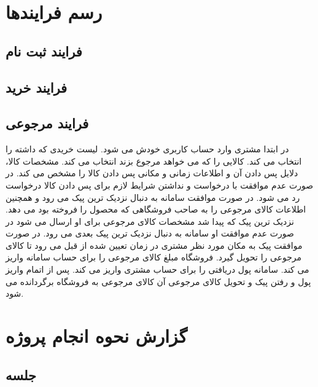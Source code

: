 \documentclass[12pt,a4paper]{article}
\begin{document}
\maketitle
\pagebreak
\tableofcontents
\pagebreak
\normalsize	



\pagebreak
\section{رسم فرایندها} \label{section.function}

\subsection{فرایند ثبت نام} \label{section.function.register}


\subsection{فرایند خرید} \label{section.function.buy}


\subsection{فرایند مرجوعی} \label{section.function.return}

در ابتدا مشتری وارد حساب کاربری خودش می شود. لیست خریدی که داشته را انتخاب می کند. کالایی را که می خواهد مرجوع بزند انتخاب می کند. مشخصات کالا، دلایل پس دادن آن و اطلاعات زمانی و مکانی پس دادن کالا را مشخص می کند. در صورت عدم موافقت با درخواست و نداشتن شرایط لازم برای پس دادن کالا درخواست رد می شود. در صورت موافقت سامانه به دنبال نزدیک ترین پیک می رود و همچنین اطلاعات کالای مرجوعی را به صاحب فروشگاهی که محصول را فروخته بود می دهد. نزدیک ترین پیک که پیدا شد مشخصات کالای مرجوعی برای او ارسال می شود در صورت عدم موافقت او سامانه به دنبال نزدیک ترین پیک بعدی می رود. در صورت موافقت پیک به مکان مورد نظر مشتری در زمان تعیین شده از قبل می رود تا کالای مرجوعی را تحویل گیرد. فروشگاه مبلغ کالای مرجوعی را برای حساب سامانه واریز می کند. سامانه پول دریافتی را برای حساب مشتری واریز می کند. پس از اتمام واریز پول و رفتن پیک و تحویل کالای مرجوعی آن کالای مرجوعی به فروشگاه برگردانده می شود.

\section{گزارش نحوه انجام پروژه} \label{section.report}

\subsection{جلسه } \label{section.report.postMortem}
\end{document}
